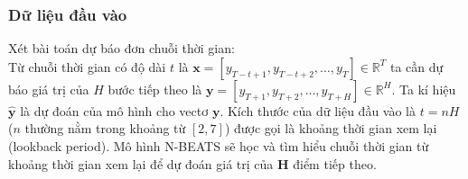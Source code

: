 \documentclass[conference]{IEEEtran}
\begin{document}
\subsubsection{Dữ liệu đầu vào}
Xét bài toán dự báo đơn chuỗi thời gian:\\
Từ chuỗi thời gian có độ dài $t$ là $\mathbf{x} =
    [y_{T-t+1}, y_{T-t+2}, \ldots, y_{T}] \in \mathbb{R}^T$ ta cần dự báo giá trị của $H$ bước tiếp theo là $\mathbf{y} =
    [y_{T+1}, y_{T+2}, \ldots, y_{T+H}] \in \mathbb{R}^H$. Ta kí hiệu $\hat{\mathbf{y}}$
là dự đoán của mô hình cho vectơ $\mathbf{y}$. Kích thước của dữ liệu đầu vào là $t = nH$ ($n$
thường nằm trong khoảng từ $[2, 7]$) được gọi là khoảng thời gian xem lại (lookback period). Mô hình N-BEATS sẽ học và tìm hiểu chuỗi thời gian từ khoảng thời gian
xem lại để dự đoán giá trị của $\mathbf{H}$ điểm tiếp theo.
\vspace{3mm}
\end{document}

